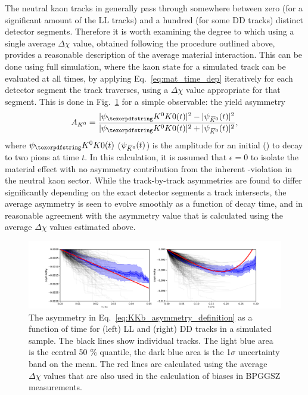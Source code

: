 The neutral kaon tracks in \lhcb generally pass through somewhere between zero (for a significant amount of the LL tracks) and a hundred (for some DD tracks) distinct detector segments. Therefore it is worth examining the degree to which using a single average $\Delta\chi$ value, obtained following the procedure outlined above, provides a reasonable description of the average material interaction. This can be done using full \lhcb simulation, where the kaon state for a simulated track can be evaluated at all times, by applying Eq.~\eqref{eq:mat_time_dep} iteratively for each detector segment the track traverses, using a $\Delta\chi$ value appropriate for that segment. 
This is done in Fig.~\ref{fig:lhcb_asymmetry} for a simple observable: the yield asymmetry 
\begin{align}\label{eq:KKb_asymmetry_definition}
    A_{K^0} = \frac{|\psi_\Kz(t)|^2 - |\psi_\Kzb(t)|^2}{|\psi_\Kz(t)|^2 + |\psi_\Kzb(t)|^2},
\end{align}
where $\psi_\Kz(t)$ ($\psi_{{\kern 0.18em\overline{\kern -0.18em K}}{}^0}(t)$) is the amplitude for an initial \Kz (\Kzb) to decay to two pions at time $t$. In this calculation, it is assumed that $\epsilon=0$ to isolate the material effect with no asymmetry contribution from the inherent \CP-violation in the neutral kaon sector. While the track-by-track asymmetries are found to differ significantly depending on the exact detector segments a track intersects, the average asymmetry is seen to evolve smoothly as a function of decay time, and in reasonable agreement with the asymmetry value that is calculated using the average $\Delta\chi$ values estimated above. 


\begin{figure}[tb]
    \centering
    \includegraphics[width=\columnwidth]{figures/ks_chapter/note_figs/lhcb_studies/material_fit_asym.pdf}
    \caption{The asymmetry in Eq.~\eqref{eq:KKb_asymmetry_definition} as a function of time for (left) LL and (right) DD \KS tracks in a simulated \lhcb sample. The black lines show individual tracks. The light blue area is the central 50 \% quantile, the dark blue area is the 1$\sigma$ uncertainty band on the mean. The red lines are calculated using the average $\Delta\chi$ values that are also used in the calculation of biases in BPGGSZ measurements.}
    \label{fig:lhcb_asymmetry}
\end{figure}



